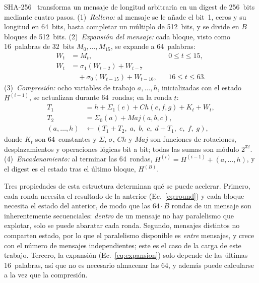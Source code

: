 \documentclass[conference]{IEEEtran}
\begin{document}
SHA-256~\cite{fips180} transforma un mensaje de longitud arbitraria en un digest de 256~bits mediante cuatro pasos. (1)~\textit{Relleno:} al mensaje se le añade el bit~1, ceros y su longitud en 64~bits, hasta completar un múltiplo de 512~bits, y se divide en $B$ bloques de 512~bits. (2)~\textit{Expansión del mensaje:} cada bloque, visto como 16~palabras de 32~bits $M_0,\dots,M_{15}$, se expande a 64~palabras:
\begin{equation}
\begin{aligned}
W_t &= M_t, && 0 \le t \le 15, \\
W_t &= \sigma_1(W_{t-2}) + W_{t-7} \\
    &\quad + \sigma_0(W_{t-15}) + W_{t-16}, && 16 \le t \le 63.
\end{aligned}
\label{eq:expansion}
\end{equation}
(3)~\textit{Compresión:} ocho variables de trabajo $a,\dots,h$, inicializadas con el estado $H^{(i-1)}$, se actualizan durante 64~rondas; en la ronda $t$:
\begin{equation}
\begin{aligned}
T_1 &= h + \Sigma_1(e) + Ch(e,f,g) + K_t + W_t, \\
T_2 &= \Sigma_0(a) + Maj(a,b,c), \\
(a,\dots,h) &\leftarrow (T_1 + T_2,\; a,\; b,\; c,\; d + T_1,\; e,\; f,\; g),
\end{aligned}
\label{eq:round}
\end{equation}
donde $K_t$ son 64~constantes y $\Sigma$, $\sigma$, $Ch$ y $Maj$ son funciones de rotaciones, desplazamientos y operaciones lógicas bit a bit; todas las sumas son módulo $2^{32}$. (4)~\textit{Encadenamiento:} al terminar las 64~rondas, $H^{(i)} = H^{(i-1)} + (a,\dots,h)$, y el digest es el estado tras el último bloque, $H^{(B)}$.

Tres propiedades de esta estructura determinan qué se puede acelerar. Primero, cada ronda necesita el resultado de la anterior (Ec.~\ref{eq:round}) y cada bloque necesita el estado del anterior, de modo que las $64 \cdot B$ rondas de un mensaje son inherentemente secuenciales: \emph{dentro} de un mensaje no hay paralelismo que explotar, solo se puede abaratar cada ronda. Segundo, mensajes distintos no comparten estado, por lo que el paralelismo disponible es \emph{entre} mensajes, y crece con el número de mensajes independientes; este es el caso de la carga de este trabajo. Tercero, la expansión (Ec.~\ref{eq:expansion}) solo depende de las últimas 16~palabras, así que no es necesario almacenar las 64, y además puede calcularse a la vez que la compresión.
\end{document}
